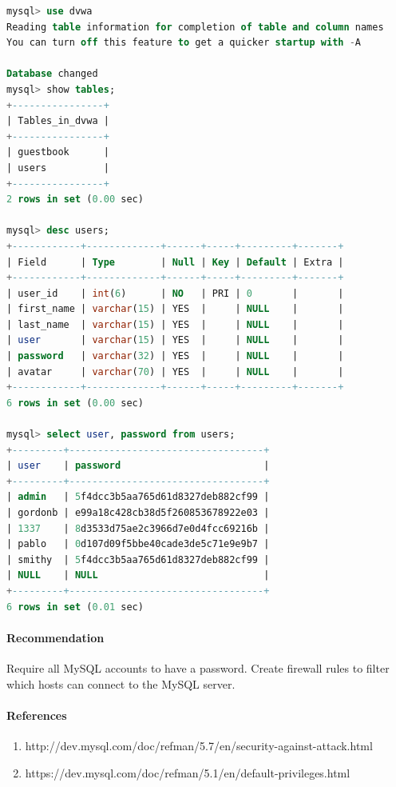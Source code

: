 \documentclass{article}
\begin{document}
\begin{lstlisting}[language=SQL]
mysql> use dvwa
Reading table information for completion of table and column names
You can turn off this feature to get a quicker startup with -A

Database changed
mysql> show tables;
+----------------+
| Tables_in_dvwa |
+----------------+
| guestbook      |
| users          |
+----------------+
2 rows in set (0.00 sec)

mysql> desc users;
+------------+-------------+------+-----+---------+-------+
| Field      | Type        | Null | Key | Default | Extra |
+------------+-------------+------+-----+---------+-------+
| user_id    | int(6)      | NO   | PRI | 0       |       |
| first_name | varchar(15) | YES  |     | NULL    |       |
| last_name  | varchar(15) | YES  |     | NULL    |       |
| user       | varchar(15) | YES  |     | NULL    |       |
| password   | varchar(32) | YES  |     | NULL    |       |
| avatar     | varchar(70) | YES  |     | NULL    |       |
+------------+-------------+------+-----+---------+-------+
6 rows in set (0.00 sec)

mysql> select user, password from users;
+---------+----------------------------------+
| user    | password                         |
+---------+----------------------------------+
| admin   | 5f4dcc3b5aa765d61d8327deb882cf99 |
| gordonb | e99a18c428cb38d5f260853678922e03 |
| 1337    | 8d3533d75ae2c3966d7e0d4fcc69216b |
| pablo   | 0d107d09f5bbe40cade3de5c71e9e9b7 |
| smithy  | 5f4dcc3b5aa765d61d8327deb882cf99 |
| NULL    | NULL                             |
+---------+----------------------------------+
6 rows in set (0.01 sec)
\end{lstlisting}

\paragraph{Recommendation}

Require all MySQL accounts to have a password.
Create firewall rules to filter which hosts can connect to the MySQL server.

\paragraph{References}

\begin{enumerate}
  \item http://dev.mysql.com/doc/refman/5.7/en/security-against-attack.html
  \item https://dev.mysql.com/doc/refman/5.1/en/default-privileges.html
\end{enumerate}
\end{document}
